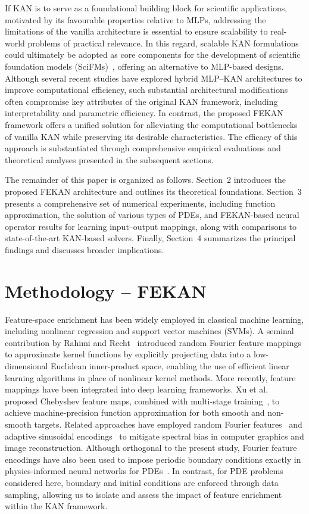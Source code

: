 \documentclass{article}
\begin{document}
If KAN is to serve as a foundational building block for scientific applications, motivated by its favourable properties relative to MLPs, addressing the limitations of the vanilla architecture is essential to ensure scalability to real-world problems of practical relevance. In this regard, scalable KAN formulations could ultimately be adopted as core components for the development of scientific foundation models (SciFMs)~\cite{menon2026scientific}, offering an alternative to MLP-based designs.
Although several recent studies have explored hybrid MLP–KAN architectures to improve computational efficiency, such substantial architectural modifications often compromise key attributes of the original KAN framework, including interpretability and parametric efficiency. In contrast, the proposed FEKAN framework offers a unified solution for alleviating the computational bottlenecks of vanilla KAN while preserving its desirable characteristics. The efficacy of this approach is substantiated through comprehensive empirical evaluations and theoretical analyses presented in the subsequent sections.

The remainder of this paper is organized as follows. Section~2 introduces the proposed FEKAN architecture and outlines its theoretical foundations. Section~3 presents a comprehensive set of numerical experiments, including function approximation, the solution of various types of PDEs, and FEKAN-based neural operator results for learning input–output mappings, along with comparisons to state-of-the-art KAN-based solvers. Finally, Section~4 summarizes the principal findings and discusses broader implications.


\section{Methodology -- FEKAN}
Feature-space enrichment has been widely employed in classical machine learning, including nonlinear regression and support vector machines (SVMs). A seminal contribution by Rahimi and Recht~\cite{rahimi2007random} introduced random Fourier feature mappings to approximate kernel functions by explicitly projecting data into a low-dimensional Euclidean inner-product space, enabling the use of efficient linear learning algorithms in place of nonlinear kernel methods. More recently, feature mappings have been integrated into deep learning frameworks. Xu et al.~\cite{xu2024chebyshev} proposed Chebyshev feature maps, combined with multi-stage training~\cite{wang2024multi}, to achieve machine-precision function approximation for both smooth and non-smooth targets. Related approaches have employed random Fourier features~\cite{tancik2020fourier} and adaptive sinusoidal encodings~\cite{sun2024learning} to mitigate spectral bias in computer graphics and image reconstruction. Although orthogonal to the present study, Fourier feature encodings have also been used to impose periodic boundary conditions exactly in physics-informed neural networks for PDEs~\cite{dong2021method}. In contrast, for PDE problems considered here, boundary and initial conditions are enforced through data sampling, allowing us to isolate and assess the impact of feature enrichment within the KAN framework.
\end{document}

